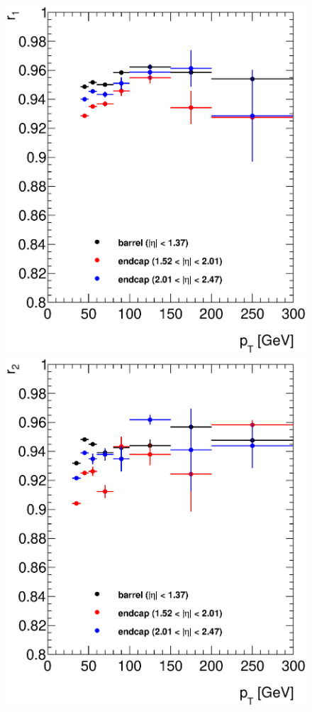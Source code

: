    \begin{figure}[h]
      \begin{center}
      \includegraphics[scale=0.41]{images/r1.eps}
      \includegraphics[scale=0.41]{images/r2.eps}

\end{center}
\end{figure}
